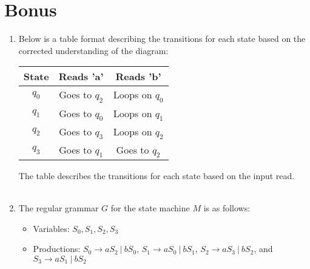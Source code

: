 \documentclass[a4paper]{article}
\begin{document}
\section{Bonus}
    \begin{enumerate}[label=(\alph*)]
        \item Below is a table format describing the transitions for each state based on the corrected understanding of the diagram: \\
        \begin{center}
            \begin{tabular}{|c|c|c|}
                \hline
                \textbf{State} & \textbf{Reads 'a'} & \textbf{Reads 'b'} \\
                \hline
                $q_0$ & Goes to $q_2$ & Loops on $q_0$ \\
                $q_1$ & Goes to $q_0$ & Loops on $q_1$ \\
                $q_2$ & Goes to $q_3$ & Loops on $q_2$ \\
                $q_3$ & Goes to $q_1$ & Goes to $q_2$ \\
                \hline
            \end{tabular}
        \end{center}

        The table describes the transitions for each state based on the input read. \\ \\

        \item The regular grammar $G$ for the state machine $M$ is as follows: \\
        \begin{itemize}
            \item Variables: $S_0, S_1, S_2, S_3$
            \item Productions: $S_0 \rightarrow aS_2 \ | \ bS_0$, $S_1 \rightarrow aS_0 \ | \ bS_1$, $S_2 \rightarrow aS_3 \ | \ bS_2$, and $S_3 \rightarrow aS_1 \ | \ bS_2$ \\ \\
        \end{itemize}



\end{enumerate}
\end{document}
